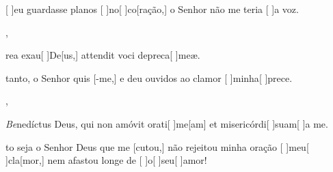 {        {\item {}[ ]{eu} guardasse planos [ ]{no}[ ]{co}[ração,] o Senhor não me teria [ ]{a} voz.},
    {\item {}rea exau[ ]{De}[us,] attendit voci depreca[ ]{me}æ.}%
        {\item {}tanto, o Senhor quis [-me,] e deu ouvidos ao clamor [ ]{mi}{nha}[ ]{pre}ce.},
    {\item {}\textit{Be}{ne}díctus Deus, qui non amóvit orati[ ]{me}[\-am] et misericórdi[ ]{su}{am}[ ]{a} me.}%
        {\item {}to seja o Senhor Deus que me [cutou,] não rejeitou minha oração [ ]{meu}[ ]{cla}[mor,] nem afastou longe de [ ]{o}[ ]{seu}[ ]{a}mor!}
}